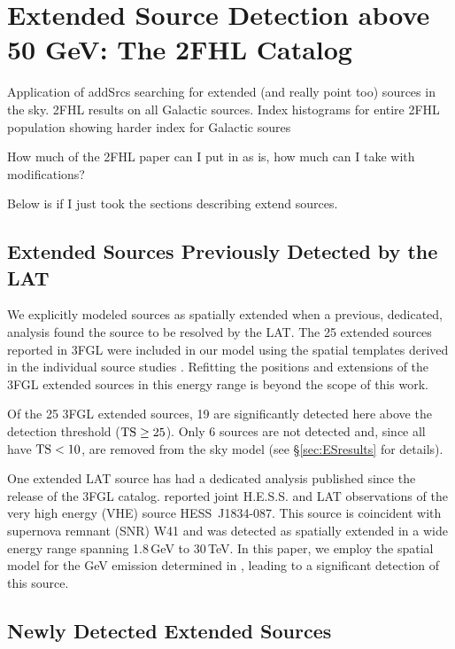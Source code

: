 \chapter{Extended Source Detection above 50 GeV: The 2FHL Catalog}
\label{chap:2FHL}

Application of addSrcs searching for extended (and really point too) sources in the sky. 2FHL results on all Galactic sources. Index histograms for entire 2FHL population showing harder index for Galactic soures 

How much of the 2FHL paper can I put in as is, how much can I take with modifications?

Below is if I just took the sections describing extend sources. 

\section{\label{sec:3FGL_ES}Extended Sources Previously Detected by the LAT}
We explicitly modeled sources as spatially extended when a previous, dedicated, analysis found the source to be resolved by the LAT.
The 25 extended sources reported in 3FGL were included in our model using the spatial templates derived in the individual source studies \citep[see references in ][]{3FGL}. Refitting the positions and extensions of the 3FGL extended sources in this energy range is beyond the scope of this work.

Of the 25 3FGL extended sources, 19 are significantly detected here above the detection threshold (${\rm TS}\geq25$). Only 6 sources are not detected and, since all have  ${\rm TS<10}$, are removed from the sky model (see \S\ref{sec:ESresults} for details).

One extended LAT source has had a dedicated analysis published since the release of the 3FGL catalog. \cite{HESSLATW41} reported joint H.E.S.S. and LAT observations of the very high energy (VHE) source HESS~J1834-087. This source is coincident with supernova remnant (SNR) W41 and was detected  as spatially extended in a wide energy range spanning 1.8\,GeV to 30\,TeV. In this paper, we employ the spatial model for the GeV emission determined in \cite{HESSLATW41}, leading to a significant detection of this source.


%
%
\section{\label{sec:newES}Newly Detected Extended Sources} %

